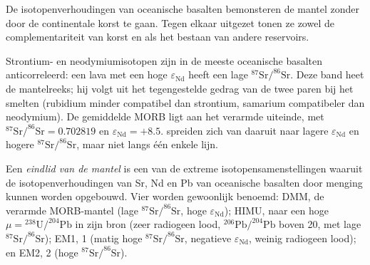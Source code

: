 De isotopenverhoudingen van oceanische basalten bemonsteren de mantel zonder door
de continentale korst te gaan. Tegen elkaar uitgezet tonen ze zowel de
complementariteit van korst en  als het bestaan van andere
reservoirs.

Strontium- en neodymiumisotopen zijn in de meeste oceanische basalten anticorreleerd: een
lava met een hoge $\varepsilon_{\mathrm{Nd}}$ heeft een lage
$^{87}\mathrm{Sr}/^{86}\mathrm{Sr}$. Deze band heet de mantelreeks; hij volgt
uit het tegengestelde gedrag van de twee paren bij het smelten (rubidium minder
compatibel dan strontium, samarium compatibeler dan neodymium). De gemiddelde
MORB ligt aan het verarmde uiteinde, met $^{87}\mathrm{Sr}/^{86}\mathrm{Sr} = 0.702819$ en
$\varepsilon_{\mathrm{Nd}} = +8.5$.  spreiden zich van daaruit naar
lagere $\varepsilon_{\mathrm{Nd}}$ en hogere $^{87}\mathrm{Sr}/^{86}\mathrm{Sr}$, maar niet
langs één enkele lijn.

\begin{definition}\label{def:b2:isotope-geochemistry:end-members}
Een \emph{eindlid van de mantel} is een van de extreme
isotopensamenstellingen waaruit de isotopenverhoudingen van Sr, Nd en Pb van oceanische
basalten door menging kunnen worden opgebouwd. Vier worden gewoonlijk benoemd: DMM, de verarmde
MORB-mantel (lage $^{87}\mathrm{Sr}/^{86}\mathrm{Sr}$, hoge $\varepsilon_{\mathrm{Nd}}$);
HIMU, naar een hoge $\mu = {}^{238}\mathrm{U}/^{204}\mathrm{Pb}$ in zijn bron
(zeer radiogeen lood, $^{206}\mathrm{Pb}/^{204}\mathrm{Pb}$ boven 20, met lage
$^{87}\mathrm{Sr}/^{86}\mathrm{Sr}$); EM1,  1 (matig hoge
$^{87}\mathrm{Sr}/^{86}\mathrm{Sr}$, negatieve $\varepsilon_{\mathrm{Nd}}$, weinig radiogeen
lood); en EM2,  2 (hoge $^{87}\mathrm{Sr}/^{86}\mathrm{Sr}$).
\end{definition}

